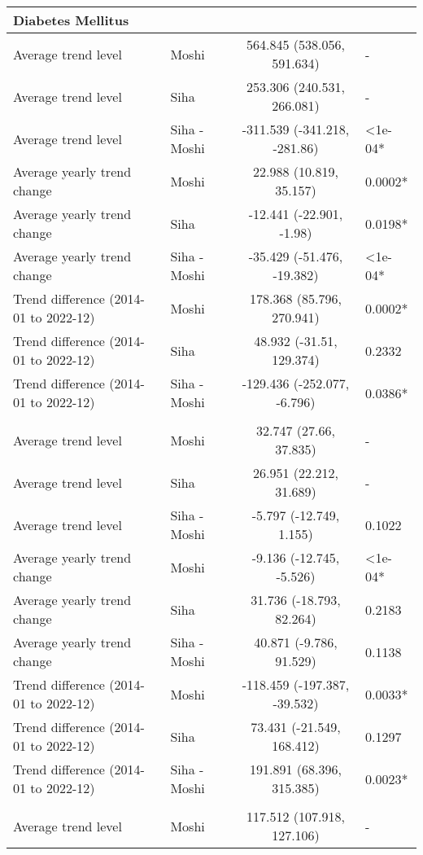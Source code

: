 \begin{longtable}{l|lcl}
\multicolumn{4}{l}{Diabetes Mellitus} \\ 
\midrule\addlinespace[2.5pt]
Average trend level & Moshi & 564.845 (538.056, 591.634) & - \\ 
Average trend level & Siha & 253.306 (240.531, 266.081) & - \\ 
Average trend level & Siha - Moshi & -311.539 (-341.218, -281.86) & <1e-04* \\ 
Average yearly trend change & Moshi & 22.988 (10.819, 35.157) & 0.0002* \\ 
Average yearly trend change & Siha & -12.441 (-22.901, -1.98) & 0.0198* \\ 
Average yearly trend change & Siha - Moshi & -35.429 (-51.476, -19.382) & <1e-04* \\ 
Trend difference (2014-01 to 2022-12) & Moshi & 178.368 (85.796, 270.941) & 0.0002* \\ 
Trend difference (2014-01 to 2022-12) & Siha & 48.932 (-31.51, 129.374) & 0.2332 \\ 
Trend difference (2014-01 to 2022-12) & Siha - Moshi & -129.436 (-252.077, -6.796) & 0.0386* \\ 
\midrule\addlinespace[2.5pt]
\multicolumn{4}{l}{Dysentery} \\ 
\midrule\addlinespace[2.5pt]
Average trend level & Moshi & 32.747 (27.66, 37.835) & - \\ 
Average trend level & Siha & 26.951 (22.212, 31.689) & - \\ 
Average trend level & Siha - Moshi & -5.797 (-12.749, 1.155) & 0.1022 \\ 
Average yearly trend change & Moshi & -9.136 (-12.745, -5.526) & <1e-04* \\ 
Average yearly trend change & Siha & 31.736 (-18.793, 82.264) & 0.2183 \\ 
Average yearly trend change & Siha - Moshi & 40.871 (-9.786, 91.529) & 0.1138 \\ 
Trend difference (2014-01 to 2022-12) & Moshi & -118.459 (-197.387, -39.532) & 0.0033* \\ 
Trend difference (2014-01 to 2022-12) & Siha & 73.431 (-21.549, 168.412) & 0.1297 \\ 
Trend difference (2014-01 to 2022-12) & Siha - Moshi & 191.891 (68.396, 315.385) & 0.0023* \\ 
\midrule\addlinespace[2.5pt]
\multicolumn{4}{l}{Epilepsy} \\ 
\midrule\addlinespace[2.5pt]
Average trend level & Moshi & 117.512 (107.918, 127.106) & - \\ 

\end{longtable}
